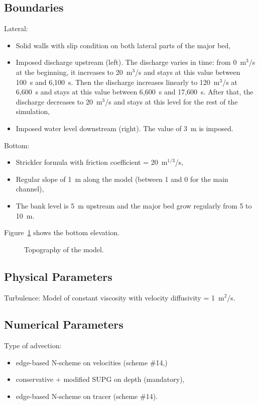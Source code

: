 \subsection{Boundaries}

Lateral:

\begin{itemize}
\item Solid walls with slip condition on both lateral parts of the major bed,
\item Imposed discharge upstream (left).
The discharge varies in time: from 0~m$^3$/s at the beginning,
it increases to 20~m$^3$/s and stays at this value between 100~s and 6,100~s.
Then the discharge increases linearly to 120~m$^{3}$/s at 6,600~s and stays at
this value between 6,600~s and 17,600~s.
After that, the discharge decreases to 20~m$^3$/s and stays at this level
for the rest of the simulation,
\item Imposed water level downstream (right). The value of 3~m is imposed.
\end{itemize}

Bottom:

\begin{itemize}
\item Strickler formula with friction coefficient = 20~m$^{1/3}$/s,
\item Regular slope of 1~m along the model (between 1 and 0 for the main channel),
\item The bank level is 5~m upstream and the major bed grow regularly from 5 to
  10~m.
\end{itemize}

Figure~\ref{fig:bridge:bathy} shows the bottom elevation.
\begin{figure}
\centering
{}
\caption{Topography of the model.}\label{fig:bridge:bathy}
\end{figure}

\subsection{Physical Parameters}

Turbulence: Model of constant viscosity with velocity diffusivity = 1~m$^2$/s.

\subsection{Numerical Parameters}

Type of advection:
\begin{itemize}
\item edge-based N-scheme on velocities (scheme \#14,)
\item conservative + modified SUPG on depth (mandatory),
\item edge-based N-scheme on tracer (scheme \#14).
\end{itemize}

